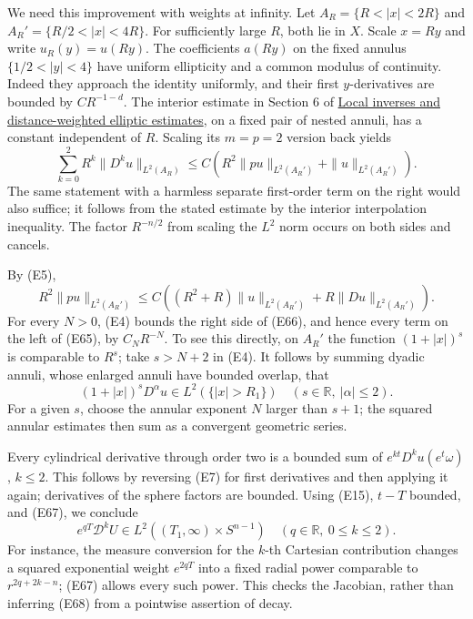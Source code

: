 \documentclass[
  11pt,
]{article}
\begin{document}
We need this improvement with weights at infinity. Let
\(A_R=\{R<|x|<2R\}\) and \(A_R'=\{R/2<|x|<4R\}\). For sufficiently large
\(R\), both lie in \(X\). Scale \(x=Ry\) and write \(u_R(y)=u(Ry)\). The
coefficients \(a(Ry)\) on the fixed annulus \(\{1/2<|y|<4\}\) have
uniform ellipticity and a common modulus of continuity. Indeed they
approach the identity uniformly, and their first \(y\)-derivatives are
bounded by \(CR^{-1-d}\). The interior estimate in Section 6 of
\href{local-elliptic-coefficients.pdf}{Local inverses and
distance-weighted elliptic estimates}, on a fixed pair of nested annuli,
has a constant independent of \(R\). Scaling its \(m=p=2\) version back
yields \[
 \sum_{k=0}^2R^k\|D^ku\|_{L^2(A_R)}
       \leq C\left(R^2\|pu\|_{L^2(A_R')}
                                  +\|u\|_{L^2(A_R')}\right).    \tag{E65}
\] The same statement with a harmless separate first-order term on the
right would also suffice; it follows from the stated estimate by the
interior interpolation inequality. The factor \(R^{-n/2}\) from scaling
the \(L^2\) norm occurs on both sides and cancels.

By (E5), \[
 R^2\|pu\|_{L^2(A_R')}
       \leq C\left((R^2+R)\|u\|_{L^2(A_R')}
                                     +R\|Du\|_{L^2(A_R')}\right).
                                                                    \tag{E66}
\] For every \(N>0\), (E4) bounds the right side of (E66), and hence
every term on the left of (E65), by \(C_NR^{-N}\). To see this directly,
on \(A_R'\) the function \((1+|x|)^s\) is comparable to \(R^s\); take
\(s>N+2\) in (E4). It follows by summing dyadic annuli, whose enlarged
annuli have bounded overlap, that \[
 (1+|x|)^sD^\alpha u\in L^2(\{|x|>R_1\})
       \quad(s\in\mathbb R,\ |\alpha|\leq2).                    \tag{E67}
\] For a given \(s\), choose the annular exponent \(N\) larger than
\(s+1\); the squared annular estimates then sum as a convergent
geometric series.

Every cylindrical derivative through order two is a bounded sum of
\(e^{kt}D^ku(e^t\omega)\), \(k\leq2\). This follows by reversing (E7)
for first derivatives and then applying it again; derivatives of the
sphere factors are bounded. Using (E15), \(t-T\) bounded, and (E67), we
conclude \[
 e^{qT}\mathcal D^kU\in L^2((T_1,\infty)\times S^{n-1})
                     \quad(q\in\mathbb R,\ 0\leq k\leq2).       \tag{E68}
\] For instance, the measure conversion for the \(k\)-th Cartesian
contribution changes a squared exponential weight \(e^{2qT}\) into a
fixed radial power comparable to \(r^{2q+2k-n}\); (E67) allows every
such power. This checks the Jacobian, rather than inferring (E68) from a
pointwise assertion of decay.
\end{document}
